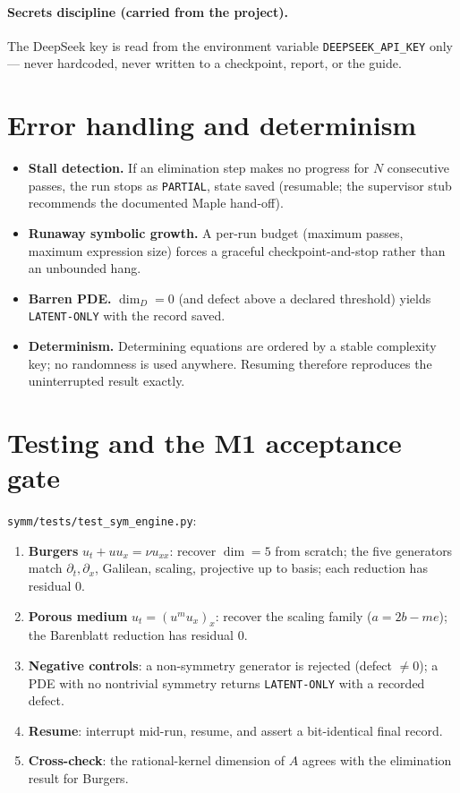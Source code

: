 \documentclass[11pt]{article}
\theoremstyle{definition}
\theoremstyle{remark}
\begin{document}
\paragraph{Secrets discipline (carried from the project).} The DeepSeek key is read from the
environment variable \texttt{DEEPSEEK\_API\_KEY} only --- never hardcoded, never written to a
checkpoint, report, or the guide.

\section{Error handling and determinism}
\label{sec:errors}

\begin{itemize}[nosep]
  \item \textbf{Stall detection.} If an elimination step makes no progress for $N$ consecutive
        passes, the run stops as \texttt{PARTIAL}, state saved (resumable; the supervisor stub
        recommends the documented Maple hand-off).
  \item \textbf{Runaway symbolic growth.} A per-run budget (maximum passes, maximum expression size)
        forces a graceful checkpoint-and-stop rather than an unbounded hang.
  \item \textbf{Barren PDE.} $\dim_D=0$ (and defect above a declared threshold) yields
        \texttt{LATENT-ONLY} with the record saved.
  \item \textbf{Determinism.} Determining equations are ordered by a stable complexity key; no
        randomness is used anywhere. Resuming therefore reproduces the uninterrupted result exactly.
\end{itemize}

\section{Testing and the M1 acceptance gate}

\texttt{symm/tests/test\_sym\_engine.py}:
\begin{enumerate}[nosep]
  \item \textbf{Burgers} $u_t+uu_x=\nu u_{xx}$: recover $\dim=5$ from scratch; the five generators
        match $\partial_t,\partial_x$, Galilean, scaling, projective up to basis; each reduction has
        residual $0$.
  \item \textbf{Porous medium} $u_t=(u^m u_x)_x$: recover the scaling family ($a=2b-me$); the
        Barenblatt reduction has residual $0$.
  \item \textbf{Negative controls}: a non-symmetry generator is rejected (defect $\neq 0$); a PDE
        with no nontrivial symmetry returns \texttt{LATENT-ONLY} with a recorded defect.
  \item \textbf{Resume}: interrupt mid-run, resume, and assert a bit-identical final record.
  \item \textbf{Cross-check}: the rational-kernel dimension of $A$ agrees with the elimination
        result for Burgers.
\end{enumerate}
\end{document}

